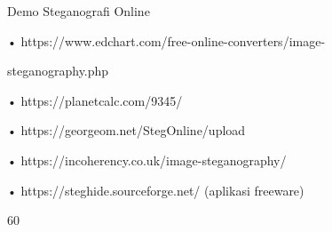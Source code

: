 \documentclass{article}
\begin{document}

Demo Steganografi Online

• https://www.edchart.com/free-online-converters/image-

steganography.php      

• https://planetcalc.com/9345/

• https://georgeom.net/StegOnline/upload

• https://incoherency.co.uk/image-steganography/ 

• https://steghide.sourceforge.net/    (aplikasi freeware)

60
\end{document}
